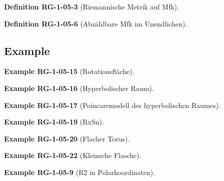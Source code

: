 \documentclass[10pt, letterpaper]{article}
\newcommand{\CustomHeading}[3]{%
  \par\medskip\noindent%
  \textbf{#1 #2} \textnormal{(#3)}.\enskip%
}
\newenvironment{DEF}[2]{\CustomHeading{Definition}{#1}{#2}}{}
\newenvironment{EXA}[2]{\CustomHeading{Example}{#1}{#2}}{}
\begin{document}
\begin{DEF}{RG-1-05-3}{Riemannische Metrik auf Mfk}

\end{DEF}

\begin{DEF}{RG-1-05-6}{Abzählbare Mfk im Unendlichen}

\end{DEF}









\subsection{Example}

\begin{EXA}{RG-1-05-15}{Rotationsfläche}

\end{EXA}

\begin{EXA}{RG-1-05-16}{Hyperbolischer Raum}

\end{EXA}

\begin{EXA}{RG-1-05-17}{Poincaremodell des hyperbolischen Raumes}

\end{EXA}

\begin{EXA}{RG-1-05-19}{RxSn}

\end{EXA}

\begin{EXA}{RG-1-05-20}{Flacher Torus}

\end{EXA}

\begin{EXA}{RG-1-05-22}{Kleinsche Flasche}

\end{EXA}

\begin{EXA}{RG-1-05-9}{R2 in Polarkoordinaten}

\end{EXA}
\end{document}
